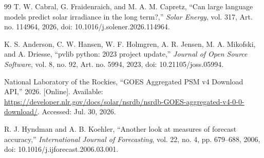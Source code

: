 \documentclass[10pt,conference,a4paper]{IEEEtran}
\begin{document}
\begin{thebibliography}{99}
T. W. Cabral, G. Fraidenraich, and M. A. M. Capretz, ``Can large language
models predict solar irradiance in the long term?,'' \textit{Solar Energy},
vol. 317, Art. no. 114964, 2026,
doi: 10.1016/j.solener.2026.114964.

K. S. Anderson, C. W. Hansen, W. F. Holmgren, A. R. Jensen, M. A. Mikofski,
and A. Driesse, ``pvlib python: 2023 project update,'' \textit{Journal of Open
Source Software}, vol. 8, no. 92, Art. no. 5994, 2023,
doi: 10.21105/joss.05994.

National Laboratory of the Rockies, ``GOES Aggregated PSM v4 Download API,''
2026. [Online]. Available:
\url{https://developer.nlr.gov/docs/solar/nsrdb/nsrdb-GOES-aggregated-v4-0-0-download/}.
Accessed: Jul. 30, 2026.

R. J. Hyndman and A. B. Koehler, ``Another look at measures of forecast
accuracy,'' \textit{International Journal of Forecasting}, vol. 22, no. 4,
pp. 679--688, 2006, doi: 10.1016/j.ijforecast.2006.03.001.

\end{thebibliography}
\end{document}
